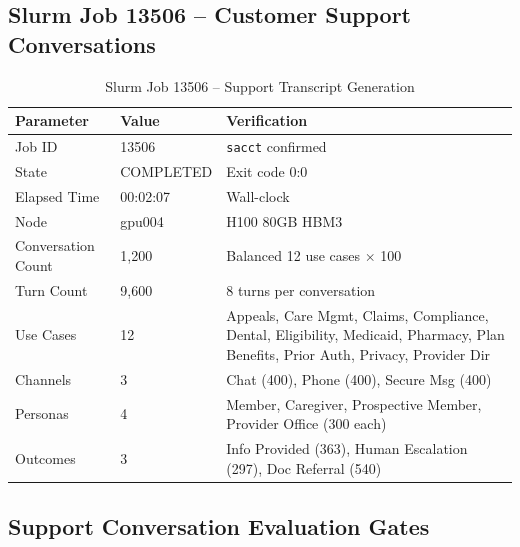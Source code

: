 \documentclass[11pt,a4paper]{article}
\begin{document}
\subsection{Slurm Job 13506 -- Customer Support Conversations}
\begin{table}[H]
\centering
\caption{Slurm Job 13506 -- Support Transcript Generation}
\label{tab:slurm_13506}
\begin{tabular}{>{\color{nvidiaWhite}}l >{\color{nvidiaWhite}}l >{\color{nvidiaWhite}}l}
\rowcolor{tableHeader}
\textbf{Parameter} & \textbf{Value} & \textbf{Verification} \\
\midrule
Job ID & 13506 & \texttt{sacct} confirmed \\
State & COMPLETED & Exit code 0:0 \\
Elapsed Time & 00:02:07 & Wall-clock \\
Node & gpu004 & H100 80GB HBM3 \\
Conversation Count & 1,200 & Balanced 12 use cases $\times$ 100 \\
Turn Count & 9,600 & 8 turns per conversation \\
Use Cases & 12 & Appeals, Care Mgmt, Claims, Compliance, Dental, Eligibility, Medicaid, Pharmacy, Plan Benefits, Prior Auth, Privacy, Provider Dir \\
Channels & 3 & Chat (400), Phone (400), Secure Msg (400) \\
Personas & 4 & Member, Caregiver, Prospective Member, Provider Office (300 each) \\
Outcomes & 3 & Info Provided (363), Human Escalation (297), Doc Referral (540) \\
\bottomrule
\end{tabular}
\end{table}

\subsection{Support Conversation Evaluation Gates}
\begin{figure}[H]
\centering
{}
\end{figure}
\end{document}

